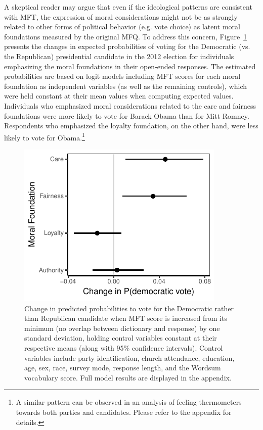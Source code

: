 \documentclass[12pt]{article}
\begin{document}
A skeptical reader may argue that even if the ideological patterns are consistent with MFT, the expression of moral considerations might not be as strongly related to other forms of political behavior (e.g. vote choice) as latent moral foundations measured by the original MFQ. To address this concern, Figure~\ref{fig:logit_vote} presents the changes in expected probabilities of voting for the Democratic (vs. the Republican) presidential candidate in the 2012 election for individuals emphasizing the moral foundations in their open-ended responses. The estimated probabilities are based on logit models including MFT scores for each moral foundation as independent variables (as well as  the remaining controls), which were held constant at their mean values when computing expected values. Individuals who emphasized moral considerations related to the care and fairness foundations were more likely to vote for Barack Obama than for Mitt Romney. Respondents who emphasized the loyalty foundation, on the other hand, were less likely to vote for Obama.\footnote{A similar pattern can be observed in an analysis of feeling thermometers towards both parties and candidates. Please refer to the appendix for details.}

\begin{figure}[ht]\centering
\includegraphics[scale=.9]{../calc/fig/logit_vote.pdf}
\caption{Change in predicted probabilities to vote for the Democratic rather than Republican candidate when MFT score is increased from its minimum (no overlap between dictionary and response) by one standard deviation, holding control variables constant at their respective means (along with 95\% confidence intervals). Control variables include party identification, church attendance, education, age, sex, race, survey mode, response length, and the Wordsum vocabulary score. Full model results are displayed in the appendix.
}\label{fig:logit_vote}
\end{figure}
\end{document}
